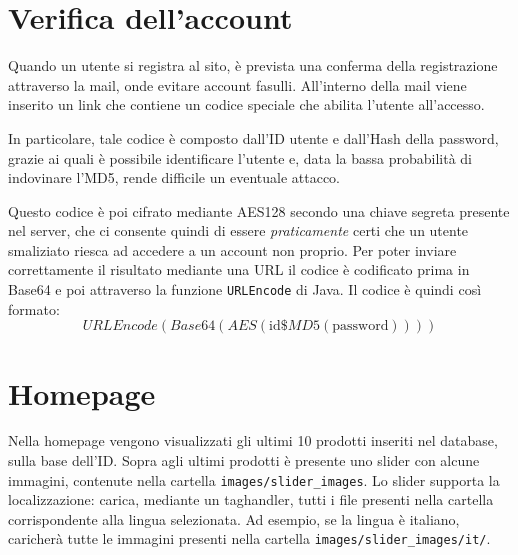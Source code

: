 \chapter{Verifica dell'account}

Quando un utente si registra al sito, è prevista una conferma della registrazione attraverso la mail, onde evitare account fasulli. All'interno della mail viene inserito un link che contiene un codice speciale che abilita l'utente all'accesso.

In particolare, tale codice è composto dall'ID utente e dall'Hash della password, grazie ai quali è possibile identificare l'utente e, data la bassa probabilità di indovinare l'MD5, rende difficile un eventuale attacco.

Questo codice è poi cifrato mediante AES128 secondo una chiave segreta presente nel server, che ci consente quindi di essere \textit{praticamente} certi che un utente smaliziato riesca ad accedere a un account non proprio. Per poter inviare correttamente il risultato mediante una URL il codice è codificato prima in Base64 e poi attraverso la funzione \texttt{URLEncode} di Java. Il codice è quindi così formato:
\[
    URLEncode( Base64( AES( \mbox{id}\$MD5(\mbox{password}))))
\]

\chapter{Homepage}
Nella homepage vengono visualizzati gli ultimi 10 prodotti inseriti nel database, sulla base dell'ID. Sopra agli ultimi prodotti è presente uno slider con alcune immagini, contenute nella cartella \texttt{images/slider\_images}. Lo slider supporta la localizzazione: carica, mediante un taghandler, tutti i file presenti nella cartella corrispondente alla lingua selezionata. Ad esempio, se la lingua è italiano, caricherà tutte le immagini presenti nella cartella \texttt{images/slider\_images/it/}.


